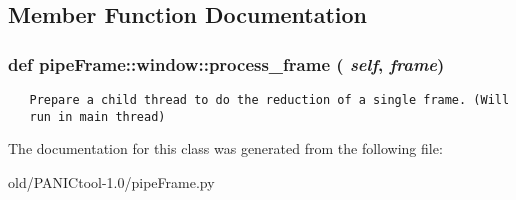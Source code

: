 \subsection{Member Function Documentation}
\subsubsection{\setlength{\rightskip}{0pt plus 5cm}def pipe\-Frame::window::process\_\-frame ( {\em self},  {\em frame})}\label{classpipeFrame_1_1window_d96488cdd2d7089356199d602813f5dd}




\footnotesize\begin{verbatim}
   Prepare a child thread to do the reduction of a single frame. (Will
   run in main thread)
\end{verbatim}
\normalsize
 

The documentation for this class was generated from the following file:\begin{CompactItemize}
\item 
old/PANICtool-1.0/pipe\-Frame.py\end{CompactItemize}
